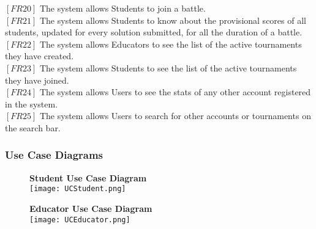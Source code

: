 \documentclass{article}
\begin{document}
$[FR20]$ The system allows Students to join a battle. \\
$[FR21]$ The system allows Students to know about the provisional scores of all students, updated for every solution submitted, for all the duration of a battle.\\
$[FR22]$ The system allows Educators to see the list of the active tournaments they have created.\\
$[FR23]$ The system allows Students to see the list of the active tournaments they have joined.\\
$[FR24]$ The system allows Users to see the stats of any other account registered in the system.\\
$[FR25]$ The system allows Users to search for other accounts or tournaments on the search bar.\\


\subsubsection{Use Case Diagrams}

\begin{figure}[H]
  \centering
  \textbf{Student Use Case Diagram} \\
  \texttt{[image: UCStudent.png]}
\end{figure}

\begin{figure}[H]
  \centering
  \textbf{Educator Use Case Diagram} \\
  \texttt{[image: UCEducator.png]}
\end{figure}

\newpage
\end{document}
